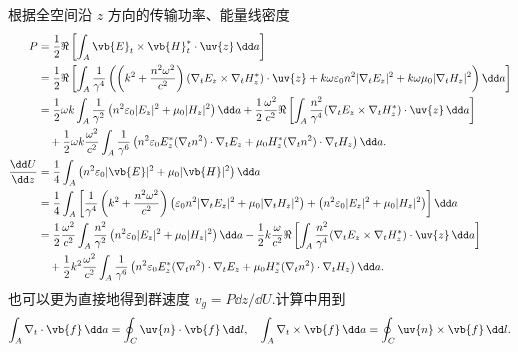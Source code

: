\begin{note}
	根据全空间沿 \(z\) 方向的传输功率、能量线密度
	\begin{align*}
		P &= \dfrac{1}{2} \Re \left[ \int_A \vb{E}_t \times \vb{H}_t^* \cdot \uv{z} \, \dd a \right] \\
		&= \dfrac{1}{2} \Re \left[ \int_A \dfrac{1}{\gamma^4} \left( \left( k^2 + \dfrac{n^2 \omega^2}{c^2} \right) (\nabla_t E_z \times \nabla_t H_z^*) \cdot \uv{z} + k\omega \varepsilon_0 n^2 |\nabla_t E_z|^2 + k\omega \mu_0 |\nabla_t H_z|^2 \right) \dd a \right] \\
		&= \dfrac{1}{2} \omega k \int_A \dfrac{1}{\gamma^2} \left( n^2 \varepsilon_0 |E_z|^2 + \mu_0 |H_z|^2 \right) \dd a + \dfrac{1}{2} \dfrac{\omega^2}{c^2} \Re \left[ \int_A \dfrac{n^2}{\gamma^4} (\nabla_t E_z \times \nabla_t H_z^*) \cdot \uv{z} \, \dd a \right] \\
		&\quad + \dfrac{1}{2} \omega k \dfrac{\omega^2}{c^2} \int_A \dfrac{1}{\gamma^6} \left( n^2 \varepsilon_0 E_z^* (\nabla_t n^2) \cdot \nabla_t E_z + \mu_0 H_z^* (\nabla_t n^2) \cdot \nabla_t H_z \right) \dd a.\\
		\dfrac{\dd U}{\dd z} &= \dfrac{1}{4} \int_A \left( n^2 \varepsilon_0 |\vb{E}|^2 + \mu_0 |\vb{H}|^2 \right) \dd a \\
		&= \dfrac{1}{4} \int_A \left[ \dfrac{1}{\gamma^4} \left( k^2 + \dfrac{n^2 \omega^2}{c^2} \right) \left( \varepsilon_0 n^2 |\nabla_t E_z|^2 + \mu_0 |\nabla_t H_z|^2 \right) + \left( n^2 \varepsilon_0 |E_z|^2 + \mu_0 |H_z|^2 \right) \right] \dd a \\
		&= \dfrac{1}{2} \dfrac{\omega^2}{c^2} \int_A \dfrac{n^2}{\gamma^2} \left( n^2 \varepsilon_0 |E_z|^2 + \mu_0 |H_z|^2 \right) \dd a - \dfrac{1}{2} k \dfrac{\omega}{c^2} \Re \left[ \int_A \dfrac{n^2}{\gamma^4} (\nabla_t E_z \times \nabla_t H_z^*) \cdot \uv{z} \, \dd a \right] \\
		&\quad + \dfrac{1}{2} k^2 \dfrac{\omega^2}{c^2} \int_A \dfrac{1}{\gamma^6} \left( n^2 \varepsilon_0 E_z^* (\nabla_t n^2) \cdot \nabla_t E_z + \mu_0 H_z^* (\nabla_t n^2) \cdot \nabla_t H_z \right) \dd a.
	\end{align*}
	也可以更为直接地得到群速度 \(v_g = P \dd z/\dd U\).计算中用到
	\begin{align*}
		\int_A \nabla_t \cdot \vb{f} \, \dd a = \oint_C \uv{n} \cdot \vb{f} \, \dd l, \quad \int_A \nabla_t \times \vb{f} \, \dd a = \oint_C \uv{n} \times \vb{f} \, \dd l.
	\end{align*}
\end{note}

